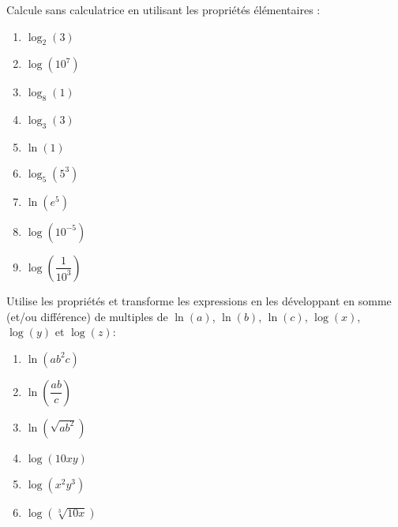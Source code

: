 \documentclass[a4paper,12pt,singlepage]{report}
\begin{document}
\begin{exercice}
Calcule sans calculatrice en utilisant les propriétés élémentaires :
\par \setlength{\columnseprule}{0 pt}
          \begin{minipage}[t]{\linewidth}
          \begin{multicols}{3}
\begin{enumerate}
\item \(\log_2(3)\)
\item \(\log(10^7)\)
\item \(\log_8(1)\)
\item \(\log_3(3)\)
\item \(\ln(1)\)
\item \(\log_5(5^3)\)
\item \(\ln(e^5)\)
\item \(\log(10^{-5})\)
\item \(\log\left(\dfrac{1}{10^3}\right)\)
\end{enumerate}


\end{multicols}\end{minipage}
\end{exercice}

\begin{exercice}
Utilise les propriétés et transforme les expressions en les développant en
somme (et/ou différence) de multiples de \(\ln(a)\), \(\ln(b)\), \(\ln(c)\),
\(\log(x)\), \(\log(y)\) et \(\log(z)\):

\par \setlength{\columnseprule}{0 pt}
          \begin{minipage}[t]{\linewidth}
          \begin{multicols}{3}
\begin{enumerate}
\item \(\ln(ab^2c)\)
\item \(\ln\left(\dfrac{ab}{c}\right)\)
\item \(\ln(\sqrt{ab^2})\)
\item \(\log(10xy)\)
\item \(\log(x^2y^3)\)
\item \(\log(\sqrt[3]{10x})\)
\end{enumerate}


\end{multicols}\end{minipage}
\end{exercice}
\end{document}
